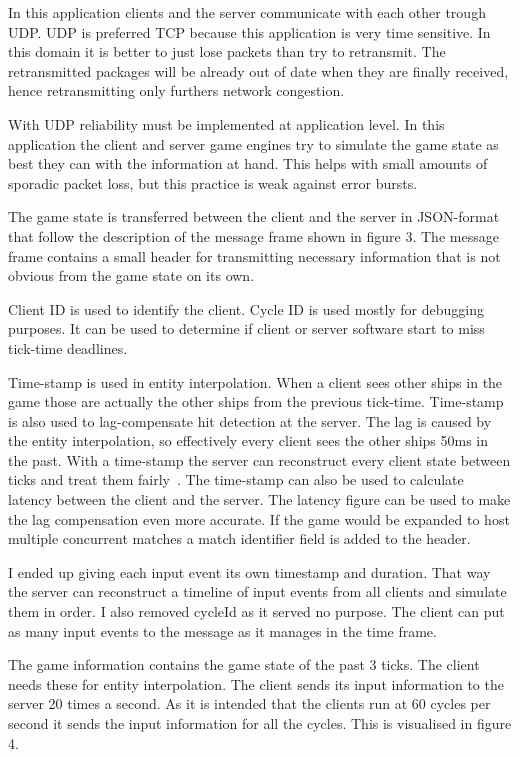 \documentclass[10pt,a4paper]{article}
\begin{document}
 In this application clients and the server communicate with each other trough
 UDP. UDP is preferred TCP because this application is very time sensitive.  In
 this domain it is better to just lose packets than try to retransmit. The
 retransmitted packages will be already out of date when they are finally
 received, hence retransmitting only furthers network congestion.

 With UDP reliability must be implemented at application level. In this
 application the client and server game engines try to simulate the game state
 as best they can with the information at hand. This helps with small amounts
 of sporadic packet loss, but this practice is weak against error bursts. 

 The game state is transferred between the client and the server in JSON-format
 that follow the description of the message frame shown in figure 3.  The
 message frame contains a small header for transmitting necessary information
 that is not obvious from the game state on its own.  

 Client ID is used to identify the client.
 Cycle ID is used mostly for debugging purposes. It 
 can be used to determine if client or server software start
 to miss tick-time deadlines.

 Time-stamp is used in entity interpolation.  When a client sees other ships in
 the game those are actually the other ships from the previous tick-time.
 Time-stamp is also used to lag-compensate hit detection at the server.  The
 lag is caused by the entity interpolation, so effectively every client sees
 the other ships 50ms in the past. With a time-stamp the server can reconstruct
 every client state between ticks and treat them fairly~\cite{bernier_latency}.
 The time-stamp can also be used to calculate latency between the client and
 the server. The latency figure can be used to make the lag compensation even
 more accurate.  If the game would be expanded to host multiple concurrent
 matches a match identifier field is added to the header.

 I ended up giving each input event its own timestamp and duration.
 That way the server can reconstruct a timeline of input events from
 all clients and simulate them in order. I also removed cycleId as it
 served no purpose. The client can put as many input events to the
 message as it manages in the time frame.

The game information contains the game state of the past 3 ticks. The client
needs these for entity interpolation. The client sends its input information
to the server 20 times a second. As it is intended that the clients run at 60 cycles
per second it sends the input information for all the cycles. This is visualised in 
figure 4.
\end{document}
